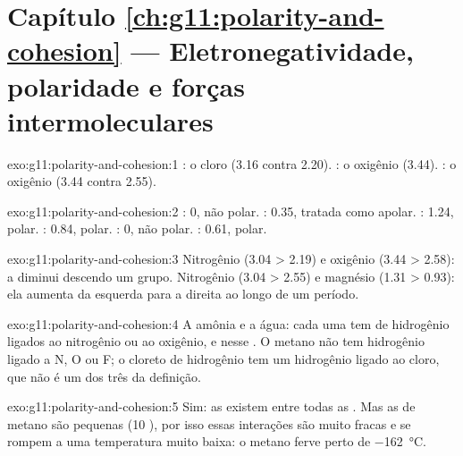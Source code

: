 \section*{Capítulo \ref{ch:g11:polarity-and-cohesion} --- Eletronegatividade, polaridade e forças intermoleculares}

\begin{solution}{exo:g11:polarity-and-cohesion:1}
: o cloro (3.16 contra 2.20). : o oxigênio (3.44).
: o oxigênio (3.44 contra 2.55).
\end{solution}

\begin{solution}{exo:g11:polarity-and-cohesion:2}
: 0, não polar. : 0.35, tratada como apolar. :
1.24, polar. : 0.84, polar. : 0, não polar. :
0.61, polar.
\end{solution}

\begin{solution}{exo:g11:polarity-and-cohesion:3}
Nitrogênio (3.04 > 2.19) e oxigênio (3.44 > 2.58): a 
diminui descendo um grupo. Nitrogênio (3.04 > 2.55) e magnésio
(1.31 > 0.93): ela aumenta da esquerda para a direita ao longo de um
período.
\end{solution}

\begin{solution}{exo:g11:polarity-and-cohesion:4}
A amônia e a água: cada uma tem  de hidrogênio ligados ao
nitrogênio ou ao oxigênio, e  nesse . O metano
não tem hidrogênio ligado a N, O ou F; o cloreto de hidrogênio tem um
hidrogênio ligado ao cloro, que não é um dos três  da definição.
\end{solution}

\begin{solution}{exo:g11:polarity-and-cohesion:5}
Sim: as  existem entre todas as .
Mas as  de metano são pequenas (10 ), por isso essas
interações são muito fracas e se rompem a uma temperatura muito baixa:
o metano ferve perto de \qty{-162}{\celsius}.
\end{solution}

